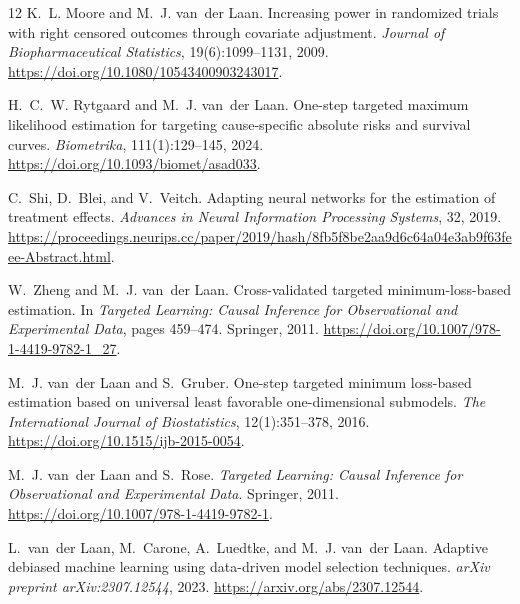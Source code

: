 \documentclass[11pt]{article}
\theoremstyle{remark}
\begin{document}
\begin{thebibliography}{12}
K.~L. Moore and M.~J. van~der Laan.
\newblock Increasing power in randomized trials with right censored outcomes through covariate adjustment.
\newblock \emph{Journal of Biopharmaceutical Statistics}, 19(6):1099--1131, 2009.
\newblock \url{https://doi.org/10.1080/10543400903243017}.

H.~C.~W. Rytgaard and M.~J. van~der Laan.
\newblock One-step targeted maximum likelihood estimation for targeting cause-specific absolute risks and survival curves.
\newblock \emph{Biometrika}, 111(1):129--145, 2024.
\newblock \url{https://doi.org/10.1093/biomet/asad033}.

C.~Shi, D.~Blei, and V.~Veitch.
\newblock Adapting neural networks for the estimation of treatment effects.
\newblock \emph{Advances in Neural Information Processing Systems}, 32, 2019.
\newblock \url{https://proceedings.neurips.cc/paper/2019/hash/8fb5f8be2aa9d6c64a04e3ab9f63feee-Abstract.html}.

W.~Zheng and M.~J. van~der Laan.
\newblock Cross-validated targeted minimum-loss-based estimation.
\newblock In \emph{Targeted Learning: Causal Inference for Observational and Experimental Data}, pages 459--474. Springer, 2011.
\newblock \url{https://doi.org/10.1007/978-1-4419-9782-1_27}.

M.~J. van~der Laan and S.~Gruber.
\newblock One-step targeted minimum loss-based estimation based on universal least favorable one-dimensional submodels.
\newblock \emph{The International Journal of Biostatistics}, 12(1):351--378, 2016.
\newblock \url{https://doi.org/10.1515/ijb-2015-0054}.

M.~J. van~der Laan and S.~Rose.
\newblock \emph{Targeted Learning: Causal Inference for Observational and Experimental Data}.
\newblock Springer, 2011.
\newblock \url{https://doi.org/10.1007/978-1-4419-9782-1}.

L.~van~der Laan, M.~Carone, A.~Luedtke, and M.~J. van~der Laan.
\newblock Adaptive debiased machine learning using data-driven model selection techniques.
\newblock \emph{arXiv preprint arXiv:2307.12544}, 2023.
\newblock \url{https://arxiv.org/abs/2307.12544}.

\end{thebibliography}
\end{document}
